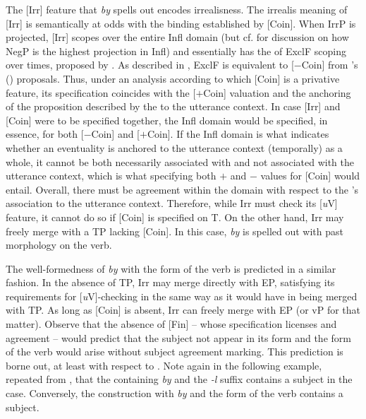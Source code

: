 \documentclass[output=paper,modfonts,newtxmath,hidelinks,]{langscibook}
\begin{document}
The [Irr] feature that \textit{by} spells out encodes irrealisness. The irrealis meaning of [Irr] is semantically at odds with the binding established by [Coin]. When IrrP is projected, [Irr] scopes over the entire Infl domain (but cf. \citealt{Cowper2010} for discussion on how NegP is the highest projection in Infl) and essentially has the  of ExclF scoping over times, proposed by \citet{Iatridou2000}. As described in , ExclF is equivalent to [$-$Coin] from \citeauthor{RitterWiltschko2005}'s (\citeyear{RitterWiltschko2005,RitterWiltschko2014}) proposals. Thus, under an analysis according to which [Coin] is a privative feature, its specification coincides with the [$+$Coin] valuation and the anchoring of the proposition described by the  to the utterance context. In case [Irr] and [Coin] were to be specified together, the Infl domain would be specified, in essence, for both [$-$Coin] and [$+$Coin]. If the Infl domain is what indicates whether an eventuality is anchored to the utterance context (temporally) as a whole, it cannot be both necessarily associated with and not associated with the utterance context, which is what specifying both $+$ and $-$ values for [Coin] would entail. Overall, there must be agreement within the domain with respect to the ’s association to the utterance context. Therefore, while Irr must check its [\textit{u}V] feature, it cannot do so if [Coin] is specified on T. On the other hand, Irr may freely merge with a TP lacking [Coin]. In this case, \textit{by} is spelled out with past morphology on the verb.\largerpage

The well-formedness of \textit{by} with the  form of the verb is predicted in a similar fashion. In the absence of TP, Irr may merge directly with EP, satisfying its requirements for [\textit{u}V]-checking in the same way as it would have in being merged with TP. As long as [Coin] is absent, Irr can freely merge with EP (or vP for that matter). Observe that the absence of [Fin] -- whose specification licenses   and agreement -- would predict that the subject not appear in its  form and the  form of the verb would arise without subject agreement marking. This prediction is borne out, at least with respect to . Note again in the following example, repeated from , that the  containing \textit{by} and the \textit{-l} suffix contains a subject in the  case. Conversely, the construction with \textit{by} and the  form of the verb contains a  subject. 
\end{document}
